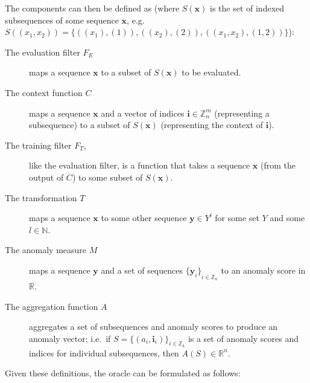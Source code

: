 The components can then be defined as (where $S(\mathbf{x})$ is the set of indexed subsequences of some sequence $\mathbf{x}$, e.g. $S((x_1, x_2)) = \{((x_1), (1)), ((x_2), (2)), ((x_1, x_2), (1, 2))\}$):
\begin{description}
    \item[The evaluation filter $F_E$]maps a sequence $\mathbf{x}$ to a subset of $S(\mathbf{x})$ to be evaluated.
    \item[The context function $C$]maps a sequence $\mathbf{x}$ and a vector of indices $\mathbf{i} \in \mathbb{Z}_n^m$ (representing a subsequence) to a subset of $S(\mathbf{x})$ (representing the context of $\mathbf{i}$).
    \item[The training filter $F_T$,]like the evaluation filter, is a function that takes a sequence $\mathbf{x}$ (from the output of $C$) to some subset of $S(\mathbf{x})$.
    \item[The transformation $T$]maps a sequence $\mathbf{x}$ to some other sequence $\mathbf{y} \in Y^l$ for some set $Y$ and some $l \in \mathbb{N}$.
    \item[The anomaly measure $M$]maps a sequence $\mathbf{y}$ and a set of sequences ${\{\mathbf{y}_i\}}_{i \in \mathbb{Z}_n}$ to an anomaly score in $\mathbb{R}$.
    \item[The aggregation function $A$]aggregates a set of subsequences and anomaly scores to produce an anomaly vector; i.e.\  if $S = {\{(a_i, \mathbf{i}_i)\}}_{i \in \mathbb{Z}_k}$ is a set of anomaly scores and indices for individual subsequences, then $A(S) \in \mathbb{R}^{n}$.
\end{description}

Given these definitions, the oracle can be formulated as follows:
\begin{algorithmic}
     
    \EndFor{}
\end{algorithmic}

